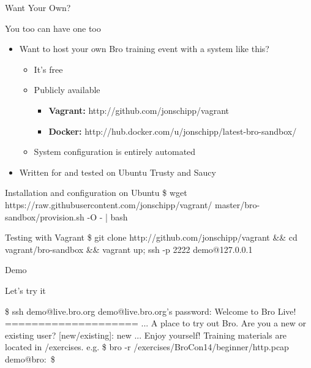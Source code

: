\documentclass[xcolor=svgnames,handout]{beamer}
\begin{document}
\begin{frame}{Want Your Own?}
  \begin{block}{You too can have one too}
    \begin{itemize}
      \item Want to host your own Bro training event with a system like this?
    	\begin{itemize}
		\item It's free
		\item Publicly available
		\begin{itemize}
			\item \textbf{Vagrant:} http://github.com/jonschipp/vagrant
			\item \textbf{Docker:} http://hub.docker.com/u/jonschipp/latest-bro-sandbox/
		\end{itemize}
		\item System configuration is entirely automated
	\end{itemize}
	\item Written for and tested on Ubuntu Trusty and Saucy
    \end{itemize}
  \end{block}
  \begin{exampleblock}{Installation and configuration on Ubuntu}
	\alert{\$ wget https://raw.githubusercontent.com/jonschipp/vagrant/
	master/bro-sandbox/provision.sh -O - | bash}
  \end{exampleblock}
  \begin{exampleblock}{Testing with Vagrant}
	\alert{\$ git clone http://github.com/jonschipp/vagrant \&\& cd vagrant/bro-sandbox \&\& vagrant up; ssh -p 2222 demo@127.0.0.1}
  \end{exampleblock}
\end{frame}

\begin{frame}{Demo}
  \begin{exampleblock}{Let's try it}
\begin{semiverbatim}
\$ ssh demo@live.bro.org \newline
demo@live.bro.org's password:  \newline
Welcome to Bro Live! \newline
==================== \newline
... 		     \newline
A place to try out Bro. \newline
Are you a new or existing user? [new/existing]: new \newline
... \newline
Enjoy yourself! \newline
Training materials are located in /exercises. \newline
e.g. \$ bro -r /exercises/BroCon14/beginner/http.pcap \newline
demo@bro:~\$
\end{semiverbatim}
  \end{exampleblock}
\end{frame}
\end{document}
